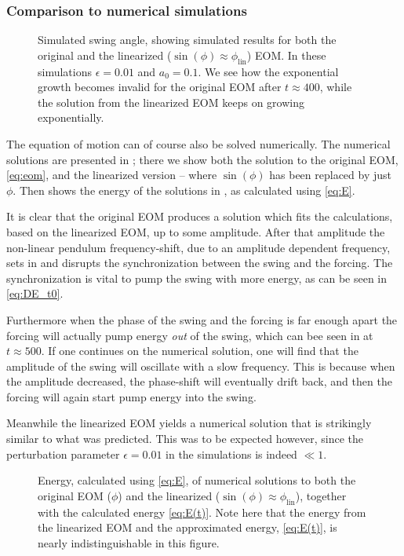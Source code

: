 \subsubsection{Comparison to numerical simulations}

\begin{figure}\centering
\caption{Simulated swing angle, showing simulated results for both the
  original and the linearized ($\sin(\phi)\approx\phi_\text{lin}$)
  EOM. In these simulations $\epsilon=0.01$ and $a_0=0.1$. We see how the
  exponential growth becomes invalid for the original EOM after
  $t\approx400$, while the solution from the linearized EOM keeps on
  growing exponentially. 
}
\label{fig:sim}
\end{figure}


The equation of motion can of course also be solved numerically. The
numerical solutions are presented in ; there we show
both the solution to the original EOM, \eqref{eq:eom}, and the
linearized version -- where $\sin(\phi)$ has been replaced by just
$\phi$. Then  shows the energy of the solutions in
, as calculated using \eqref{eq:E}.

It is clear that the original EOM produces a solution which fits the
calculations, based on the linearized EOM, up to some amplitude. After
that amplitude the non-linear pendulum frequency-shift, due to an
amplitude dependent frequency, sets in and disrupts the
synchronization between the swing and the forcing. The synchronization is vital
to pump the swing with more energy, as can be seen in
\eqref{eq:DE_t0}. 

Furthermore when the phase of the swing and the
forcing is far enough apart the forcing will actually pump energy
\emph{out} of the swing, which can bee seen in  at
$t\approx500$. If one continues on the numerical solution, one will
find that the amplitude of the swing will oscillate with a slow
frequency. This is because when the amplitude decreased, the
phase-shift will eventually drift back, and then the forcing
will again start pump energy into the swing. 

Meanwhile the linearized EOM yields a numerical solution that is
strikingly similar to what was predicted. This was to be expected
however, since the perturbation parameter $\epsilon=0.01$ in the
simulations is indeed $\ll1$.

\begin{figure}\centering
\caption{Energy, calculated using \eqref{eq:E}, of numerical solutions
  to both the original EOM ($\phi$) and the linearized
  ($\sin(\phi)\approx\phi_\text{lin}$), together with the calculated energy
  \eqref{eq:E(t)}. Note here that the energy from the linearized EOM
  and the approximated energy, \eqref{eq:E(t)}, is nearly
  indistinguishable in this figure.
}
\label{fig:sim_E}
\end{figure}








